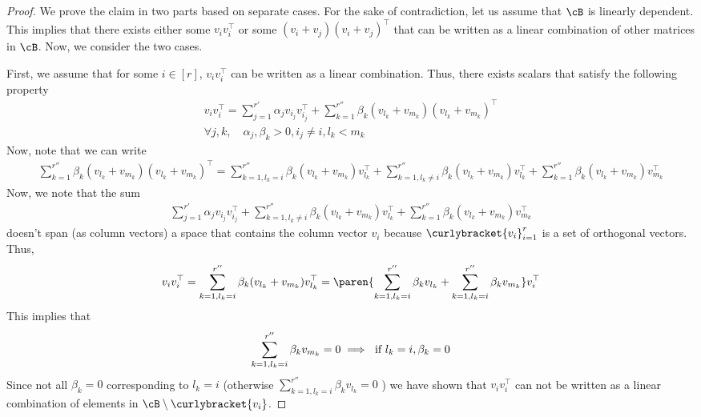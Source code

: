 \begin{proof}
    We prove the claim in two parts based on separate cases. For the sake of contradiction, let us assume that $\cB$ is linearly dependent. This implies that there exists either some $v_iv_i^{\top}$ or some $(v_i+ v_j)(v_i+ v_j)^{\top}$ that can be written as a linear combination of other matrices in $\cB$. Now, we consider the two cases.
    
    First, we assume that for some $i \in [r]$, $v_iv_i^{\top}$ can be written as a linear combination. Thus, there exists scalars that satisfy the following property
    \begin{gather}
        v_iv_i^{\top} = \sum_{j = 1}^{r'} \alpha_{j}v_{i_j}v_{i_j}^{\top} + \sum_{k = 1}^{r''} \beta_{k}(v_{l_k} + v_{m_k})(v_{l_k} + v_{m_k})^{\top}\\
        \forall j,k,\quad \alpha_j, \beta_k > 0, i_j \neq i, l_k < m_k
    \end{gather}
    Now, note that we can write
    \begin{align*}
       \sum_{k = 1}^{r''} \beta_{k}(v_{l_k} + v_{m_k})(v_{l_k} + v_{m_k})^{\top} =  \sum_{k = 1, l_k = i}^{r''} \beta_{k}(v_{l_k} + v_{m_k})v_{l_k}^{\top} + \sum_{k = 1, l_k \neq i}^{r''} \beta_{k}(v_{l_k} + v_{m_k})v_{l_k}^{\top} + \sum_{k = 1}^{r''} \beta_{k}(v_{l_k} + v_{m_k})v_{m_k}^{\top}
    \end{align*}
    Now, we note that the sum 
    \begin{align*}
        \sum_{j = 1}^{r'} \alpha_{j}v_{i_j}v_{i_j}^{\top} + \sum_{k = 1, l_k \neq i}^{r''} \beta_{k}(v_{l_k} + v_{m_k})v_{l_k}^{\top} + \sum_{k = 1}^{r''} \beta_{k}(v_{l_k} + v_{m_k})v_{m_k}^{\top}
    \end{align*}
    doesn't span (as column vectors) a space that contains the column vector $v_i$ because $\curlybracket{v_i}_{i=1}^r$ is a set of orthogonal vectors. Thus, 
    \begin{align}
        v_iv_i^{\top} = \sum_{k = 1, l_k = i}^{r''} \beta_{k}(v_{l_k} + v_{m_k})v_{l_k}^{\top} = \paren{\sum_{k = 1, l_k = i}^{r''} \beta_k v_{l_k} + \sum_{k = 1, l_k = i}^{r''} \beta_k v_{m_k}}v_i^{\top} \label{eq: v1}
    \end{align}
    This implies that 
    \begin{align}
        \sum_{k = 1, l_k = i}^{r''} \beta_k v_{m_k} = 0 \implies \textnormal{ if } l_k = i, \beta_k = 0 \label{eq: v2}
    \end{align}
    Since not all $\beta_k = 0$ corresponding to $l_k = i$ (otherwise $\sum_{k = 1, l_k = i}^{r''} \beta_k v_{l_k} = 0$ ) we have shown that $v_iv_i^{\top}$ can not be written as a linear combination of elements in $\cB \setminus \curlybracket{v_i}$.


\end{proof}
